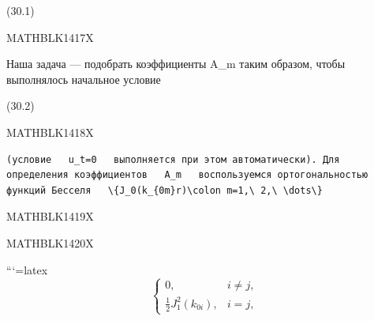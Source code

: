 \documentclass[
]{article}
\begin{document}
(30.1)

MATHBLK1417X

Наша задача --- подобрать коэффициенты A\_m таким образом, чтобы
выполнялось начальное условие

(30.2)

MATHBLK1418X

\begin{verbatim}
(условие   u_t=0   выполняется при этом автоматически). Для определения коэффициентов   A_m   воспользуемся ортогональностью функций Бесселя   \{J_0(k_{0m}r)\colon m=1,\ 2,\ \dots\} 
\end{verbatim}

MATHBLK1419X

MATHBLK1420X

```{=latex}
\[
\begin{cases} 0, & i \neq j, \\ \frac{1}{2} J_{1}^{2}(k_{0i}), & i = j, \end{cases}
\]
\end{document}
